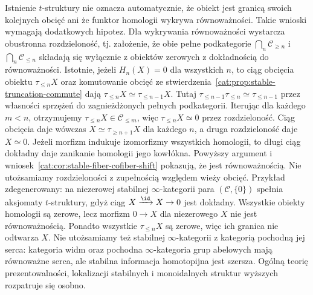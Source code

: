 \begin{uwaga}\label{cat:rem:stable-infty-scope}
Istnienie $t$-struktury nie oznacza automatycznie, że obiekt jest granicą swoich kolejnych obcięć ani że funktor homologii wykrywa równoważności. Takie wnioski wymagają dodatkowych hipotez. Dla wykrywania równoważności wystarcza obustronna rozdzieloność, tj. założenie, że obie pełne podkategorie $\bigcap_n\mathcal C_{\geq n}$ i $\bigcap_n\mathcal C_{\leq n}$ składają się wyłącznie z obiektów zerowych z dokładnością do równoważności. Istotnie, jeżeli $H_n(X)=0$ dla wszystkich $n$, to ciąg obcięcia obiektu $\tau_{\leq n}X$ oraz komutowanie obcięć ze stwierdzenia~\ref{cat:prop:stable-truncation-commute} dają $\tau_{\leq n}X\simeq\tau_{\leq n-1}X$. Tutaj $\tau_{\leq n-1}\tau_{\leq n}\simeq\tau_{\leq n-1}$ przez własności sprzężeń do zagnieżdżonych pełnych podkategorii. Iterując dla każdego $m<n$, otrzymujemy $\tau_{\leq n}X\in\mathcal C_{\leq m}$, więc $\tau_{\leq n}X\simeq0$ przez rozdzieloność. Ciąg obcięcia daje wówczas $X\simeq\tau_{\geq n+1}X$ dla każdego $n$, a druga rozdzieloność daje $X\simeq0$. Jeżeli morfizm indukuje izomorfizmy wszystkich homologii, to długi ciąg dokładny daje zanikanie homologii jego kowłókna. Powyższy argument i wniosek~\ref{cat:cor:stable-fiber-cofiber-shift} pokazują, że jest równoważnością. Nie utożsamiamy rozdzieloności z zupełnością względem wieży obcięć. Przykład zdegenerowany: na niezerowej stabilnej $\infty$-kategorii para $(\mathcal C,\{0\})$ spełnia aksjomaty $t$-struktury, gdyż ciąg $X\xrightarrow{\id}X\to0$ jest dokładny. Wszystkie obiekty homologii są zerowe, lecz morfizm $0\to X$ dla niezerowego $X$ nie jest równoważnością. Ponadto wszystkie $\tau_{\leq n}X$ są zerowe, więc ich granica nie odtwarza $X$. Nie utożsamiamy też stabilnej $\infty$-kategorii z kategorią pochodną jej serca: kategoria widm oraz pochodna $\infty$-kategoria grup abelowych mają równoważne serca, ale stabilna informacja homotopijna jest szersza. Ogólną teorię prezentowalności, lokalizacji stabilnych i monoidalnych struktur wyższych rozpatruje się osobno.
\end{uwaga}
